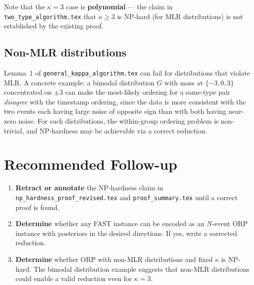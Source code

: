 \documentclass[11pt]{article}
\begin{document}
\medskip
\noindent Note that the $\kappa = 3$ case is \textbf{polynomial} --- the claim in
\texttt{two\_type\_algorithm.tex} that $\kappa \ge 3$ is NP-hard (for MLR
distributions) is not established by the existing proof.

\subsection{Non-MLR distributions}

Lemma~1 of \texttt{general\_kappa\_algorithm.tex} can fail for distributions that
violate MLR\@.  A concrete example: a bimodal distribution $G$ with mass at
$\{-3, 0, 3\}$ concentrated on $\pm 3$ can make the most-likely ordering for a
same-type pair \emph{disagree} with the timestamp ordering, since the data is more
consistent with the two events each having large noise of opposite sign than with
both having near-zero noise.  For such distributions, the within-group ordering
problem is non-trivial, and NP-hardness may be achievable via a correct reduction.

\section{Recommended Follow-up}

\begin{enumerate}
\item \textbf{Retract or annotate} the NP-hardness claim in
  \texttt{np\_hardness\_proof\_revised.tex} and \texttt{proof\_summary.tex} until a
  correct proof is found.
\item \textbf{Determine} whether any FAST instance can be encoded as an $N$-event ORP
  instance with posteriors in the desired directions.  If yes, write a corrected
  reduction.
\item \textbf{Determine} whether ORP with non-MLR distributions and fixed $\kappa$ is
  NP-hard.  The bimodal distribution example suggests that non-MLR distributions
  could enable a valid reduction even for $\kappa = 3$.
\end{enumerate}
\end{document}
